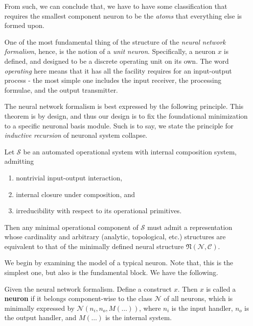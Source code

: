 \begin{note}
From such, we can conclude that, we have to have some classification that requires the smallest component neuron to be the \textit{atoms} that everything else is formed upon.
\end{note}

One of the most fundamental thing of the structure of the \textit{neural network formalism}, hence, is the notion of a \textit{unit neuron}. Specifically, a neuron $x$ is defined, and designed to be a discrete operating unit on its own. The word \textit{operating} here means that it has all the facility requires for an input-output process - the most simple one includes the input receiver, the processing formulae, and the output transmitter. 

The neural network formalism is best expressed by the following principle. This theorem is by design, and thus our design is to fix the foundational minimization to a specific neuronal basis module. Such is to say, we state the principle for \textit{inductive recursion} of neuronal system collapse. 

\begin{theorem}\label{thm:fundamental_neuron}
Let $\mathcal{S}$ be an automated operational system with internal composition system, admitting
\begin{enumerate}[topsep=1pt,itemsep=1pt]
    \item nontrivial input-output interaction,
    \item internal closure under composition, and
    \item irreducibility with respect to its operational primitives.
\end{enumerate}
Then any minimal operational component of $\mathcal{S}$ must admit a representation whose cardinality and arbitrary (analytic, topological, etc.) structures are equivalent to that of the minimally defined neural structure $\mathfrak{N}(\mathcal{N},\mathcal{C})$.
\end{theorem}

We begin by examining the model of a typical neuron. Note that, this is the simplest one, but also is the fundamental block. We have the following. 

\begin{definition}[Neuron]
    Given the neural network formalism. Define a construct $x$. Then $x$ is called a \textbf{neuron} if it belongs component-wise to the class $\mathcal{N}$ of all neurons, which is minimally expressed by $\mathcal{N}(n_{i},n_{o},M(\dots))$, where $n_{i}$ is the input handler, $n_{o}$ is the output handler, and $M(\dots)$ is the internal system. %
\end{definition}

